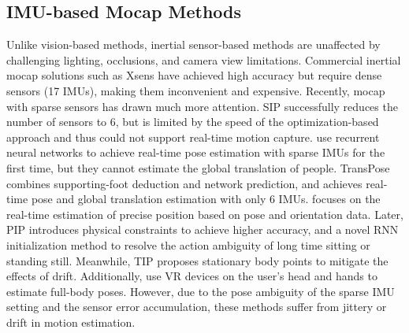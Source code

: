 \subsection{IMU-based Mocap Methods}
Unlike vision-based methods, inertial sensor-based methods are unaffected by challenging lighting, occlusions, and camera view limitations.  
%
Commercial inertial mocap solutions such as Xsens \cite{schepers2018xsens} have achieved high accuracy but require dense sensors (17 IMUs), making them inconvenient and expensive.  
%
Recently, mocap with sparse sensors has drawn much more attention.
%
%
%
% 
%
SIP \cite{SIP} successfully reduces the number of sensors to 6, but is limited by the speed of the optimization-based approach and thus could not support real-time motion capture.
%
\cite{DIP, RNN-Ensemble} use recurrent neural networks to achieve real-time pose estimation with sparse IMUs for the first time, but they cannot estimate the global translation of people.  
%
TransPose \cite{TransPose} combines supporting-foot deduction and network prediction, and achieves real-time pose and global translation estimation with only 6 IMUs.  
%
\cite{schreiner2021global} focuses on the real-time estimation of precise position based on pose and orientation data.
%
Later, PIP \cite{PIP} introduces physical constraints \cite{physCap} to achieve higher accuracy, and a novel RNN initialization method to resolve the action ambiguity of long time sitting or standing still.
%
Meanwhile, TIP \cite{TIP} proposes stationary body points to mitigate the effects of drift.  
%
Additionally, \cite{jiang2022avatarposer,winkler2022questsim,ye2022neural3points,aliakbarian2022flag} use VR devices on the user's head and hands to estimate full-body poses.
%
However, due to the pose ambiguity of the sparse IMU setting and the sensor error accumulation, these methods suffer from jittery or drift in motion estimation.
%
